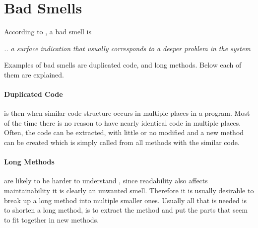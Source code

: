 \section{Bad Smells}
According to \citet{code:smell}, a bad smell is 
\begin{center}
\textit{.. a surface indication that usually corresponds to a deeper problem in the system}
\end{center}

Examples of bad smells are duplicated code, and long methods. Below each of them are explained. 

\paragraph{Duplicated Code} is then when similar code structure occurs in multiple places in a program. Most of the time there is no reason to have nearly identical code in multiple places. Often, the code can be extracted, with little or no modified and a new method can be created which is simply called from all methods with the similar code. 

\paragraph{Long Methods} are likely to be harder to understand \citet[p. 64]{fowler:refac}, since readability also affects maintainability it is clearly an unwanted smell. Therefore it is usually desirable to break up a long method into multiple smaller ones. Usually all that is needed is to shorten a long method, is to extract the method and put the parts that seem to fit together in new methods.

